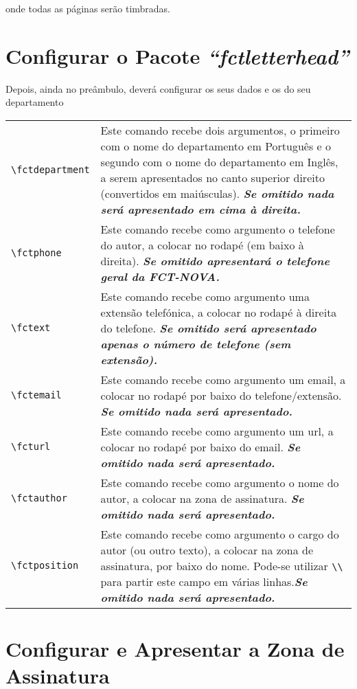 \documentclass[a4paper]{article}
\newcommand*{\thePackage}{\emph{“fctletterhead”}}
\begin{document}
\noindent onde todas as páginas serão timbradas.

\section{Configurar o Pacote \thePackage}

Depois, ainda no preâmbulo, deverá configurar os seus dados e os do seu departamento

\bgroup
  \renewcommand{\arraystretch}{1.5}
  \begin{xltabular}{\textwidth}{lX}
    \verb+\fctdepartment+ & Este comando recebe dois argumentos, o primeiro com o nome do departamento em Português e o segundo com o nome do departamento em Inglês, a serem apresentados no canto superior direito (convertidos em maiúsculas).  \textbf{\textsl{Se omitido nada será apresentado em cima à direita.}}\\
    \verb+\fctphone+   & Este comando recebe como argumento o telefone do autor, a colocar no rodapé (em baixo à direita). \textbf{\textsl{Se omitido apresentará o telefone geral da FCT-NOVA.}}\\
    \verb+\fctext+   & Este comando recebe como argumento uma extensão telefónica, a colocar no rodapé à direita do telefone. \textbf{\textsl{Se omitido será apresentado apenas o número de telefone (sem extensão).}}\\
    \verb+\fctemail+  & Este comando recebe como argumento um email, a colocar no rodapé por baixo do telefone/extensão. \textbf{\textsl{Se omitido nada será apresentado.}}\\
    \verb+\fcturl+   & Este comando recebe como argumento um url, a colocar no rodapé por baixo do email. \textbf{\textsl{Se omitido nada será apresentado.}}\\
    \verb+\fctauthor+     & Este comando recebe como argumento o nome do autor, a colocar na zona de assinatura.  \textbf{\textsl{Se omitido nada será apresentado.}}\\
    \verb+\fctposition+   & Este comando recebe como argumento o cargo do autor (ou outro texto), a colocar na zona de assinatura, por baixo do nome.  Pode-se utilizar \verb+\\+ para partir este campo em várias linhas.\textbf{\textsl{Se omitido nada será apresentado.}}\\
  \end{xltabular}
\egroup

\section{Configurar e Apresentar a Zona de Assinatura}
\end{document}
